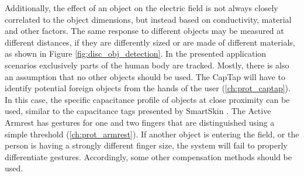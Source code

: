 Additionally, the effect of an object on the electric field is not always closely correlated to the object dimensions, but instead based on conductivity, material and other factors. The same response to different objects may be measured at different distances, if they are differently sized or are made of different materials, as shown in Figure \ref{fig:disc_obj_detection}. In the presented application scenarios exclusively parts of the human body are tracked. Mostly, there is also an assumption that no other objects should be used. The CapTap will have to identify potential foreign objects from the hands of the user (\ref{ch:prot_captap}). In this case, the specific capacitance profile of objects at close proximity can be used, similar to the capacitance tags presented by SmartSkin \cite{rekimoto2002smartskin}. The Active Armrest has gestures for one and two fingers that are distinguished using a simple threshold (\ref{ch:prot_armrest}). If another object is entering the field, or the person is having a strongly different finger size, the system will fail to properly differentiate gestures. Accordingly, some other compensation methods should be used.

